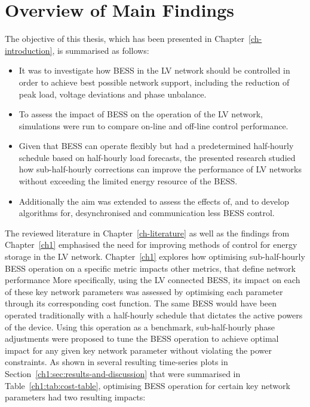 \section{Overview of Main Findings}
\label{ch-conclusions:sec:main-findings}

The objective of this thesis, which has been presented in Chapter~\ref{ch-introduction}, is summarised as follows:

\begin{itemize}
	\item
	It was to investigate how BESS in the LV network should be controlled in order to achieve best possible network support, including the reduction of peak load, voltage deviations and phase unbalance.
	\item 
	To assess the impact of BESS on the operation of the LV network, simulations were run to compare on-line and off-line control performance.
	\item
	Given that BESS can operate flexibly but had a predetermined half-hourly schedule based on half-hourly load forecasts, the presented research studied how sub-half-hourly corrections can improve the performance of LV networks without exceeding the limited energy resource of the BESS.
	\item
	Additionally the aim was extended to assess the effects of, and to develop algorithms for, desynchronised and communication less BESS control.
\end{itemize}

The reviewed literature in Chapter~\ref{ch-literature} as well as the findings from Chapter~\ref{ch1} emphasised the need for improving methods of control for energy storage in the LV network.
Chapter~\ref{ch1} explores how optimising sub-half-hourly BESS operation on a specific metric impacts other metrics, that define network performance
More specifically, using the LV connected BESS, its impact on each of these key network parameters was assessed by optimising each parameter through its corresponding cost function.
The same BESS would have been operated traditionally with a half-hourly schedule that dictates the active powers of the device.
Using this operation as a benchmark, sub-half-hourly phase adjustments were proposed to tune the BESS operation to achieve optimal impact for any given key network parameter without violating the power constraints.
As shown in several resulting time-series plots in Section~\ref{ch1:sec:results-and-discussion} that were summarised in Table~\ref{ch1:tab:cost-table}, optimising BESS operation for certain key network parameters had two resulting impacts:

